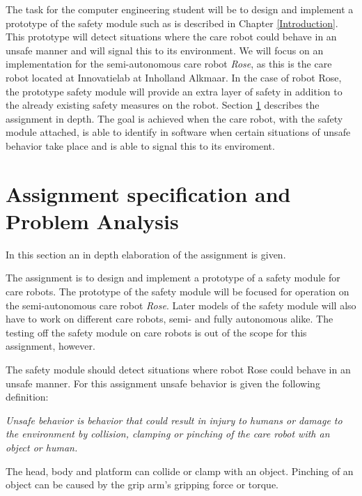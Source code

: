 \documentclass[12pt]{scrreprt}
\begin{document}
The task for the computer engineering student will be to design and implement a prototype of the safety module such as is described in Chapter \ref{Introduction}. This prototype will detect situations where the care robot could behave in an unsafe manner and will signal this to its environment. We will focus on an implementation for the semi-autonomous care robot \textit{Rose}, as this is the care robot located at Innovatielab at Inholland Alkmaar. In the case of robot Rose, the prototype safety module will provide an extra layer of safety in addition to the already existing safety measures on the robot. Section \ref{Assignment specification} describes the assignment in depth. 
 The goal is achieved when the care robot, with the safety module attached, is able to identify in software when certain situations of unsafe behavior take place and is able to signal this to its enviroment.
 
\section{Assignment specification and Problem Analysis}
\label{Assignment specification}

In this section an in depth elaboration of the assignment is given.
\par
The assignment is to design and implement a prototype of a safety module for care robots. The prototype of the safety module will be focused for operation on the semi-autonomous care robot \textit{Rose}. Later models of the safety module will also have to work on different care robots, semi- and fully autonomous alike. The testing off the safety module on care robots is out of the scope for this assignment, however.
\par
The safety module should detect situations where robot Rose could behave in an unsafe manner. For this assignment unsafe behavior is given the following definition:
\begin{flushleft}
\textit{
Unsafe behavior is behavior that could result in injury to humans or damage to the environment by collision, clamping or pinching of the care robot with an object or human.
}
\end{flushleft}
The head, body and platform can collide or clamp with an object. Pinching of an object can be caused by the grip arm's gripping force or torque. %
 
\end{document}
